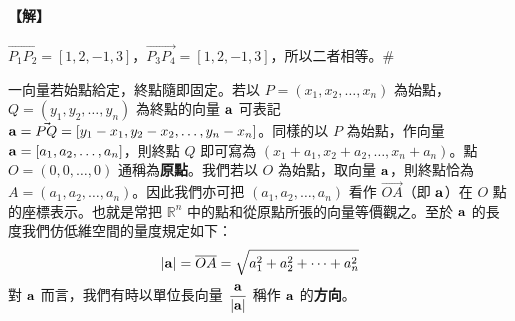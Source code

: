 \paragraph{【解】}
$\vec{P_1P_2}=[1, 2, -1, 3]$，$\vec{P_3P_4}=[1, 2, -1, 3]$，所以二者相等。\hfill$\#$

一向量若始點給定，終點隨即固定。若以 $P=(x_1, x_2, \dots, x_n)$ 為始點，$Q=(y_1, y_2, \dots, y_n)$ 為終點的向量 $\boldsymbol{\mathbf{a}}$ 可表記 $\boldsymbol{\mathbf{a}}=\vec{PQ}=[y_1-x_1, y_2-x_2, \dots, y_n-x_n]$。同樣的以 $P$ 為始點，作向量 $\boldsymbol{\mathbf{a}}=[a_1, a_2, \dots, a_n]$，則終點 $Q$ 即可寫為 $(x_1+a_1, x_2+a_2, \dots, x_n+a_n)$。點 $O=(0, 0, \dots, 0)$ 通稱為\textbf{原點}。我們若以 $O$ 為始點，取向量 $\boldsymbol{\mathbf{a}}$，則終點恰為 $A=(a_1, a_2, \dots, a_n)$。因此我們亦可把 $(a_1, a_2, \dots, a_n)$ 看作 $\vec{OA}$（即 $\boldsymbol{\mathbf{a}}$）在 $O$ 點的座標表示。也就是常把 $\mathbb{R}^n$ 中的點和從原點所張的向量等價觀之。至於 $\boldsymbol{\mathbf{a}}$ 的長度我們仿低維空間的量度規定如下：
\begin{equation}
|\boldsymbol{\mathbf{a}}| = \overline{OA} = \sqrt{a_1^2 + a_2^2 + \dots + a_n^2} \label{eq:b6-1-1-2}
\end{equation}
對 $\boldsymbol{\mathbf{a}}$ 而言，我們有時以單位長向量 $\dfrac{\boldsymbol{\mathbf{a}}}{|\boldsymbol{\mathbf{a}}|}$ 稱作 $\boldsymbol{\mathbf{a}}$ 的\textbf{方向}。

